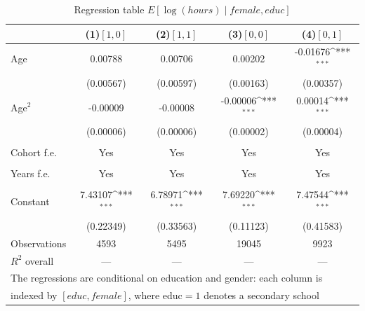 \begin{table}[htbp]\centering
\def\sym#1{\ifmmode^{#1}\else\(^{#1}\)\fi}
\caption{Regression table \(E[\log(hours)\mid female,educ]\) \label{Tab:reg4}}
\begin{tabular}{l*{4}{c}}
\toprule
                    &\multicolumn{1}{c}{(1)\([1,0]\)\label{Reg:4_h_m}}         &\multicolumn{1}{c}{(2)\([1,1]\)\label{Reg:4_h_f}}         &\multicolumn{1}{c}{(3)\([0,0]\)\label{Reg:4_l_m}}         &\multicolumn{1}{c}{(4)\([0,1]\)\label{Reg:4_l_f}}         \\
\midrule
Age                 &     0.00788         &     0.00706         &     0.00202         &    -0.01676\sym{***}\\
                    &   (0.00567)         &   (0.00597)         &   (0.00163)         &   (0.00357)         \\
\addlinespace
Age\(^2\)           &    -0.00009         &    -0.00008         &    -0.00006\sym{***}&     0.00014\sym{***}\\
                    &   (0.00006)         &   (0.00006)         &   (0.00002)         &   (0.00004)         \\
                    \\
                    Cohort f.e.          &       Yes        &      Yes &       Yes        &      Yes \\
                                                \\
                    \addlinespace
                    Years f.e.            &       Yes         &       Yes   &       Yes        &      Yes       \\
                                               \\
                    \addlinespace
Constant            &     7.43107\sym{***}&     6.78971\sym{***}&     7.69220\sym{***}&     7.47544\sym{***}\\
                    &   (0.22349)         &   (0.33563)         &   (0.11123)         &   (0.41583)         \\
\midrule
Observations        &        4593         &        5495         &       19045         &        9923         \\
$R^2$ overall       &   ---   &   ---   &   ---   &   ---   \\
\bottomrule
\multicolumn{5}{l}{\footnotesize The regressions are conditional on education and gender: each column is}\\
\multicolumn{5}{l}{\footnotesize indexed by \([educ,female]\), where educ\(=1\) denotes a secondary school}\\

\end{tabular}
\end{table}
